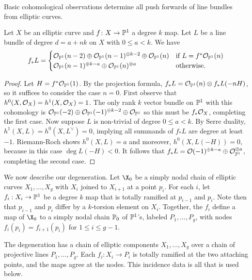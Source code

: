 Basic cohomological observations determine all push forwards of line bundles from elliptic curves.
\begin{Lemma}
\notready \label{ezpush}
Let $X$ be an elliptic curve and $f\colon  X \rightarrow \pp^1$ a degree $k$ map. Let $L$ be a line bundle of degree $d = a + nk$ on $X$ with $0 \leq a < k$. We have
\[f_*L = \begin{cases}  \O_{\pp^1}(n-2) \oplus \O_{\pp^1}(n-1)^{\oplus k-2} \oplus  \O_{\pp^1}(n) &\text{if $L = f^*\O_{\pp^1}(n)$} \\  \O_{\pp^1}(n-1)^{\oplus k-a} \oplus \O_{\pp^1}(n)^{\oplus a} &\text{otherwise.} \end{cases}\]
 \end{Lemma}
\begin{proof}
Let $H = f^*\O_{\pp^1}(1)$. By the projection formula, $f_* L = \O_{\pp^1}(n) \otimes f_* L(-nH)$, so it suffices to consider the case $n = 0$.
First observe that $h^0(X,\O_X) = h^1(X,\O_X) = 1$. The only rank $k$ vector bundle on $\pp^1$ with this cohomology is $\O_{\pp^1}(-2) \oplus \O_{\pp^1}(-1)^{\oplus k-2} \oplus \O_{\pp^1}$ so this must be $f_*\O_X$, completing the first case.
Now suppose $L$ is non-trivial of degree $0 \leq a < k$. By Serre duality, $h^1(X,L) = h^0(X,L^\vee) = 0$, implying all summands of $f_*L$ are degree at least $-1$. Riemann-Roch shows $h^0(X,L) = a$ and moreover, $h^0(X,L(-H)) = 0$, because in this case $\deg L(-H) < 0$. It follows that $f_*L = \O(-1)^{\oplus k-a} \oplus \O_{\pp^1}^{\oplus a}$, completing the second case.
\end{proof}




We now describe our degeneration. Let $\X_0$ be a simply nodal chain of elliptic curves $X_1, \ldots, X_g$ with $X_i$ joined to $X_{i+1}$ at a point $p_i$.
For each $i$, let $f_i: X_i \rightarrow \pp^1$ be a degree $k$ map that is totally ramified at $p_{i-1}$ and $p_i$.
Note then that $p_{i-1}$ and $p_{i}$ differ by a $k$-torsion element on $X_i$.
Together, the $f_i$ define a map of $\X_0$ to a simply nodal chain $\P_0$ of $\pp^1$'s, labeled $P_1, \ldots, P_g$, with nodes $f_i(p_i) = f_{i+1}(p_i)$ for $1 \leq i \leq g-1$.

The degeneration has a chain of elliptic components $X_1,\ldots,X_g$ over a
chain of projective lines $P_1,\ldots,P_g$.  Each $f_i:X_i\to P_i$ is totally
ramified at the two attaching points, and the maps agree at the nodes.  This
incidence data is all that is used below.

